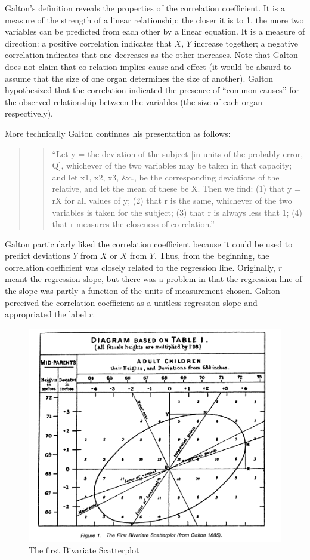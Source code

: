 \documentclass[
]{report}
\begin{document}
Galton's definition reveals the properties of the correlation coefficient. It is a measure of the strength of a linear relationship; the closer it is to 1, the more two variables can be predicted from each other by a linear equation. It is a measure of direction: a positive correlation indicates that \(X\), \(Y\) increase together; a negative correlation indicates that one decreases as the other increases. Note that Galton does not claim that co-relation implies cause and effect (it would be absurd to assume that the size of one organ determines the size of another). Galton hypothesized that the correlation indicated the presence of ``common causes'' for the observed relationship between the variables (the size of each organ respectively).

More technically Galton continues his presentation as follows:

\begin{quote}
\begin{quote}
``Let y = the deviation of the subject {[}in units of the probably error, Q{]}, whichever of the two variables may be taken in that capacity; and let x1, x2, x3, \&c., be the corresponding deviations of the relative, and let the mean of these be X. Then we find: (1) that y = rX for all values of y; (2) that r is the same, whichever of the two variables is taken for the subject; (3) that r is always less that 1; (4) that r measures the closeness of co-relation.''
\end{quote}
\end{quote}

Galton particularly liked the correlation coefficient because it could be used to predict deviations \(Y\) from \(X\) or \(X\) from \(Y\). Thus, from the beginning, the correlation coefficient was closely related to the regression line. Originally, \(r\) meant the regression slope, but there was a problem in that the regression line of the slope was partly a function of the units of measurement chosen. Galton perceived the correlation coefficient as a unitless regression slope and appropriated the label \(r\).

\begin{figure}
    \centering
    \includegraphics[width= 250 pt]{Galton.PNG}
    \caption{The first Bivariate Scatterplot}
    \label{fig:my_label}
\end{figure}
\end{document}

